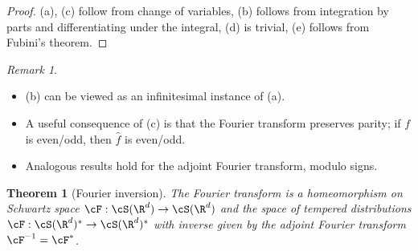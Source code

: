 \documentclass[reqno]{amsart}
\newtheorem{theorem}{Theorem}
\theoremstyle{definition}
\theoremstyle{remark}
\newtheorem*{remark}{Remark}
\begin{document}
\begin{proof}
	(a), (c) follow from change of variables, (b) follows from integration by parts and differentiating under the integral, (d) is trivial, (e) follows from Fubini's theorem. 
\end{proof}

\begin{remark}
\leavevmode
\begin{itemize}
	\item (b) can be viewed as an infinitesimal instance of (a). 
	\item A useful consequence of (c) is that the Fourier transform preserves parity; if $f$ is even/odd, then $\widehat f$ is even/odd. 
	\item Analogous results hold for the adjoint Fourier transform, modulo signs. 
\end{itemize}
\end{remark}

\begin{theorem}[Fourier inversion]
	The Fourier transform is a homeomorphism on Schwartz space $\cF: \cS (\R^d) \to \cS (\R^d)$ and the space of tempered distributions $\cF : \cS (\R^d)^* \to \cS (\R^d)^*$	 with inverse given by the adjoint Fourier transform $\cF^{-1} = \cF^*$. 
\end{theorem}
	
\end{document}

